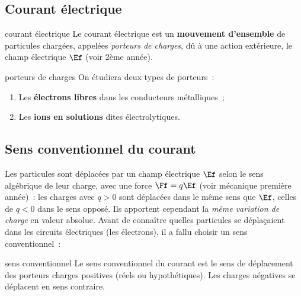\documentclass[../main/main.tex]{subfiles}
\begin{document}
\subsection{Courant électrique}
\begin{tcbraster}[raster columns=2, raster equal height=rows]
    \begin{defi}[label=def:courant]{courant électrique}
        Le courant électrique est un \textbf{mouvement d'ensemble} de particules
        chargées, appelées \textit{porteurs de charges}, dû à une action
        extérieure, le champ électrique $\Ef$ (voir 2ème année).
    \end{defi}
    \begin{exem}[label=exem:porteurs]{porteurs de charges}
        On étudiera deux types de porteurs~:
        \begin{enumerate}
            \item Les \textbf{électrons libres} dans les conducteurs métalliques~;
            \item Les \textbf{ions en solutions} dites électrolytiques.
        \end{enumerate}
    \end{exem}
\end{tcbraster}

\subsection{Sens conventionnel du courant}

\begin{tcbraster}[raster columns=3, raster equal height=rows]
    \begin{tcolorbox}[blankest, raster multicolumn=2, valign=center]
    Les particules sont déplacées par un champ électrique $\Ef$ selon le sens
    algébrique de leur charge, avec une force $\Ff = q\Ef$ (voir mécanique
    première année)~: les charges avec $q>0$ sont déplacées dans le même sens
    que $\Ef$, celles de $q<0$ dans le sens opposé. Ils apportent cependant la
    \textit{même variation de charge} en valeur absolue. Avant de connaître
    quelles particules se déplaçaient dans les circuits électriques (les
    électrons), il a fallu choisir un sens conventionnel~:
    \end{tcolorbox}    
    \begin{defi}[label=def:sensconv]{sens conventionnel}
        Le sens conventionnel du courant est le sens de déplacement des porteurs
        charges positives (réels ou hypothétiques). Les charges négatives se
        déplacent en sens contraire.
    \end{defi}
\end{tcbraster}
\end{document}
